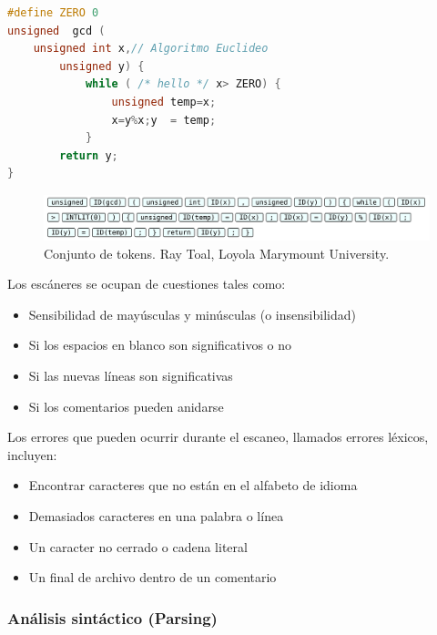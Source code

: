 \begin{lstlisting}[language=c, label={lst:example}, caption={Código de ejemplo}, captionpos={b}, frame={shadowbox}]
#define ZERO 0
unsigned  gcd (
    unsigned int x,// Algoritmo Euclideo
        unsigned y) {
            while ( /* hello */ x> ZERO) {
                unsigned temp=x;
                x=y%x;y  = temp;
            }
        return y;
}
\end{lstlisting}

\begin{figure}[ht]
    \centering
    \includegraphics[scale=0.2]{images/tokens.png}
    \caption{Conjunto de tokens. Ray Toal, Loyola Marymount University.}
    \label{fig:tokens}
\end{figure}

Los escáneres se ocupan de cuestiones tales como:
\begin{itemize}
    \item Sensibilidad de mayúsculas y minúsculas (o insensibilidad)
    \item Si los espacios en blanco son significativos o no
    \item Si las nuevas líneas son significativas
    \item Si los comentarios pueden anidarse
\end{itemize}
\bigskip

Los errores que pueden ocurrir durante el escaneo, llamados errores léxicos, incluyen:
\begin{itemize}
    \item Encontrar caracteres que no están en el alfabeto de idioma
    \item Demasiados caracteres en una palabra o línea
    \item Un caracter no cerrado o cadena literal
    \item Un final de archivo dentro de un comentario
\end{itemize}

\subsubsection{Análisis sintáctico (Parsing)}

